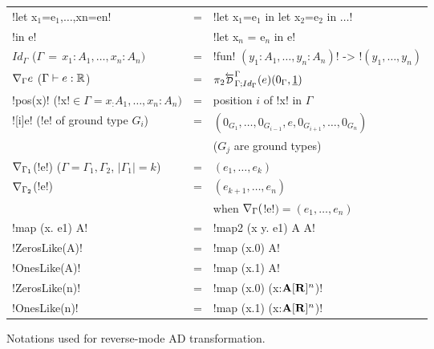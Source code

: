\begin{figure}
\begin{tabular}{|l c l|}
    \hline
    !let x$_{1}$=e$_{1}$,$\ldots$,xn=en!  & \multirow{2}{*}{=} & !let x$_{1}$=e$_{1}$ in let x$_{2}$=e$_{2}$ in $\ldots$! \\
    !in e! && !let x$_n$ = e$_n$ in e!\\ \hline
    $Id_\Gamma$ \quad\quad\quad ($\Gamma \, = \, x_1:A_1,\ldots,x_n:A_n)$ & = & !fun! $(y_1:A_1,\ldots,y_n:A_n)$! -> !$(y_1,\ldots,y_n)$ \\ \hline
    $\nabla_\Gamma e$ \quad\quad\hspace{0.6em}($\Gamma\vdash e:\mathbb{R}$) & = & $\pi_2\directD{\Gamma}{\Gamma}{Id_\Gamma}(e)(0_\Gamma,\underline{1})$ \\ \hline
    !pos(x)! \quad(!x!$\in\Gamma=x_:A_1,\ldots,x_n:A_n)$ & = & position $i$ of !x! in $\Gamma$ \\ \hline
    ![i]e! \quad\quad(!e! of ground type $G_i$) & \multirow{2}{*}{=} &  $(0_{G_1},\ldots,0_{G_{i-1}},e,0_{G_{i+1}},\ldots,0_{G_n})$ \\
    && ($G_j$ are ground types) \\ \hline
    $\nabla_{\Gamma_1}$(!e!) \quad\quad($\Gamma=\Gamma_1,\Gamma_2$, $|\Gamma_1|=k$)& = & $(e_1,\ldots,e_k)$ \\
    $\nabla_{\Gamma_2}$(!e!) & = & $(e_{k+1},\ldots,e_n)$ \\
    && when $\nabla_{\Gamma}($!e!$) = (e_1,\ldots,e_n)$ \\ \hline
    !map (x. e1) A! & = & !map2 (x y. e1) A A! \\ \hline
    !ZerosLike(A)! & = & !map (x.0) A! \\ \hline
    !OnesLike(A)! & = & !map (x.1) A! \\ \hline
    !ZerosLike(n)! & = & !map (x.0) (x:$\mathbf{A}[\mathbf{R}]^{n}$)! \\ \hline
    !OnesLike(n)! & = & !map (x.1) (x:$\mathbf{A}[\mathbf{R}]^{n}$)! \\ \hline
\end{tabular}
\caption{Notations used for reverse-mode AD transformation.}
\label{tbl:notation:one}
\end{figure}
